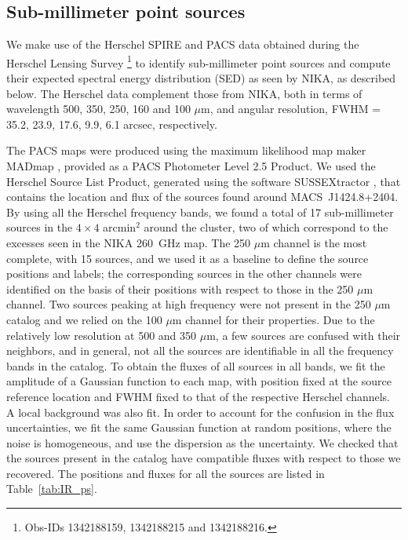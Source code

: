 \documentclass[twocolumn,traditabstract]{aa}
\begin{document}
\subsection{Sub-millimeter point sources}\label{sec:smmps}
We make use of the Herschel  SPIRE \citep{griffin2010} and PACS \citep{poglitsch2010} data obtained during the Herschel Lensing Survey \citep[HLS,][]{egami2010,rawle2012}\footnote{Obs-IDs 1342188159, 1342188215 and 1342188216.} to identify sub-millimeter point sources and compute their expected spectral energy distribution (SED) as seen by NIKA, as described below. The Herschel data complement those from  NIKA, both in terms of wavelength 500, 350, 250, 160 and 100 $\mu$m, and angular resolution, FWHM = 35.2, 23.9, 17.6, 9.9, 6.1 arcsec, respectively.

The PACS maps were produced using the maximum likelihood map maker MADmap \citep{cantalupo2010}, provided as a PACS Photometer Level 2.5 Product. We used the Herschel Source List Product, generated using the software SUSSEXtractor \citep{savage2007}, that contains the location and flux of the sources found around \mbox{MACS~J1424.8+2404}. By using all the Herschel frequency bands, we found a total of 17 sub-millimeter sources in the $4 \times 4$ arcmin$^2$ around the cluster, two of which correspond to the excesses seen in the NIKA 260~GHz map. The 250 $\mu$m channel is the most complete, with 15 sources, and we used it as a baseline to define the source positions and labels; the corresponding sources in the other channels were identified on the basis of their positions with respect to those in the 250 $\mu$m channel. Two sources peaking at high frequency were not present in the 250 $\mu$m catalog and we relied on the 100 $\mu$m channel for their properties. Due to the relatively low resolution at 500 and 350 $\mu$m, a few sources are confused with their neighbors, and in general, not all the sources are identifiable in all the frequency bands in the catalog. To obtain the fluxes of all sources in all bands, we fit the amplitude of a Gaussian function to each map, with position fixed at the source reference location and FWHM fixed to that of the respective Herschel channels. A local background was also fit. In order to account for the confusion in the flux uncertainties, we fit the same Gaussian function at random positions, where the noise is homogeneous, and use the dispersion as the uncertainty. We checked that the sources present in the catalog have compatible fluxes with respect to those we recovered. The positions and fluxes for all the sources are listed in Table~\ref{tab:IR_ps}.
\end{document}
